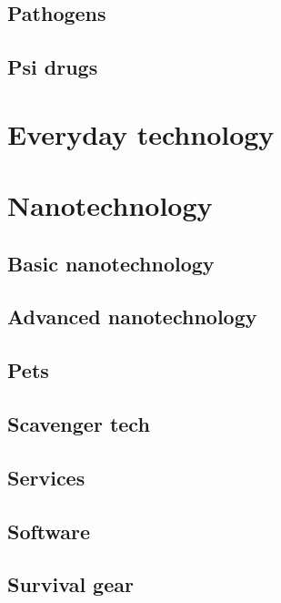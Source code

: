 \subsection{Pathogens}
\label{sec:pathogens}

\subsection{Psi drugs}
\label{sec:psi-drugs}

\section{Everyday technology}
\label{sec:everyday-tech}

\section{Nanotechnology}
\label{sec:nanotech}

\subsection{Basic nanotechnology}
\label{sec:basic-nanotech}

\subsection{Advanced nanotechnology}
\label{sec:advanced-nanotech}

\subsection{Pets}
\label{sec:pets}

\subsection{Scavenger tech}
\label{sec:scavenger-tech}

\subsection{Services}
\label{sec:services}

\subsection{Software}
\label{sec:software}

\subsection{Survival gear}
\label{sec:survival-gear}


